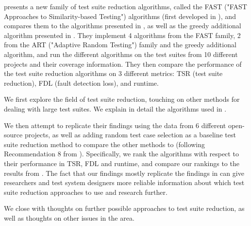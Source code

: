 \cite{cruciani2019scalable} presents a new family of test suite reduction
algorithms, called the FAST ("FAST Approaches to Similarity-based
Testing") algorithms (first developed in \cite{miranda2018fast}), and
compares them to the algorithms presented in \cite{chen2010adaptive},
as well as the greedy additional algorithm presented in
\cite{rothermel2001prioritizing}. They implement 4 algorithms from the
FAST family, 2 from the ART ("Adaptive Random Testing") family and the
greedy additional algorithm, and run the different algorithms on the test
suites from 10 different projects and their coverage information. They
then compare the performance of the test suite reduction algorithms on
3 different metrics: TSR (test suite reduction), FDL (fault detection
loss), and runtime.

We first explore the field of test suite reduction, touching on other
methods for dealing with large test suites. We explain in detail the
algorithms used in \cite{cruciani2019scalable}.

We then attempt to replicate their findings using the data
from 6 different open-source projects, as well as adding random
test case selection as a baseline test suite reduction method
to compare the other methods to (following Recommendation 8 from
\cite{khan2018systematic}). Specifically, we rank the algorithms with
respect to their performance in TSR, FDL and runtime, and compare our
rankings to the results from \cite{cruciani2019scalable}. The fact that
our findings mostly replicate the findings in \cite{cruciani2019scalable}
can give researchers and test system designers more reliable information
about which test suite reduction approaches to use and research further.

We close with thoughts on further possible approaches to test suite
reduction, as well as thoughts on other issues in the area.
